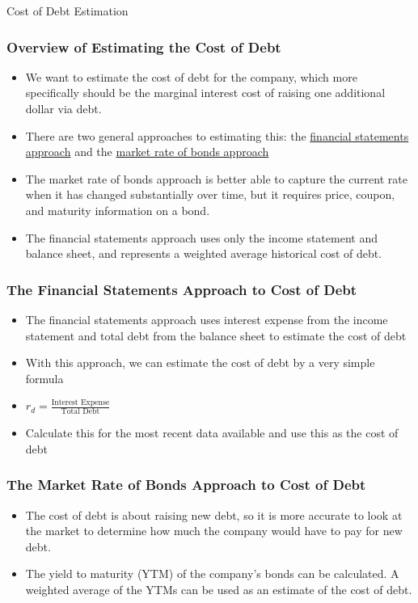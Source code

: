 \documentclass[handout, 11pt]{beamer}
\begin{document}
\begin{section}[Debt]{Cost of Debt Estimation}
\begin{frame}
\frametitle{Overview of Estimating the Cost of Debt}
\begin{itemize}
\item We want to estimate the cost of debt for the company, which more specifically should be the marginal interest cost of raising one additional dollar via debt.
\vfill
\item There are two general approaches to estimating this: the
\underline{financial statements approach}
and the
\underline{market rate of bonds approach}
\vfill
\item The market rate of bonds approach is better able to capture the current rate when it has changed substantially over time, but it requires price, coupon, and maturity information on a bond.
\vfill
\item The financial statements approach uses only the income statement and balance sheet, and represents a weighted average historical cost of debt.
\end{itemize}
\end{frame}
\begin{frame}
\frametitle{The Financial Statements Approach to Cost of Debt}
\begin{itemize}
\item The financial statements approach uses interest expense from the income statement and total debt from the balance sheet to estimate the cost of debt
\vfill
\item With this approach, we can estimate the cost of debt by a very simple formula
\vfill
\item $r_d = \frac{\text{Interest Expense}}{\text{Total Debt}}$
\vfill
\item Calculate this for the most recent data available and use this as the cost of debt
\end{itemize}
\end{frame}
\begin{frame}
\frametitle{The Market Rate of Bonds Approach to Cost of Debt}
\begin{itemize}
\item The cost of debt is about raising new debt, so it is more accurate to look at the market to determine how much the company would have to pay for new debt.
\vfill
\item The yield to maturity (YTM) of the company's bonds can be calculated. A weighted average of the YTMs can be used as an estimate of the cost of debt.

\end{itemize}
\end{frame}
\end{section}
\end{document}
